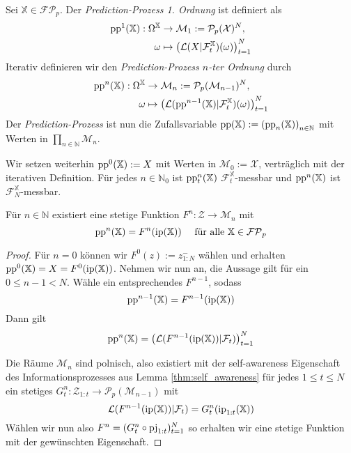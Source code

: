     \begin{definition}
        Sei $\mathbb{X} \in \mathcal{FP}_p$. Der \emph{Prediction-Prozess 1. Ordnung} ist definiert als
        \begin{align*}
            \operatorname{pp}^1(\mathbb{X}): \Omega^\mathbb{X} &\rightarrow \mathcal{M}_1 := \mathcal{P}_p(\mathcal{X})^N, \\
            \omega &\mapsto \left(\mathcal{L}(X \vert \mathcal{F}_t^\mathbb{X})(\omega)\right)_{t=1}^{N}
        \end{align*}
        Iterativ definieren wir den \emph{Prediction-Prozess $n$-ter Ordnung} durch
        \begin{align*}
            \operatorname{pp}^n(\mathbb{X}): \Omega^\mathbb{X} &\rightarrow \mathcal{M}_n := \mathcal{P}_p(\mathcal{M}_{n-1})^N, \\
            \omega &\mapsto \left(\mathcal{L}(\operatorname{pp}^{n-1}(\mathbb{X}) \vert \mathcal{F}_t^\mathbb{X})(\omega)\right)_{t=1}^{N}
        \end{align*}
        Der \emph{Prediction-Prozess} ist nun die Zufallsvariable $\operatorname{pp}(\mathbb{X}) := \left(\operatorname{pp}_n(\mathbb{X})\right)_{n\in\mathbb{N}}$ mit Werten in $\prod_{n\in\mathbb{N}} \mathcal{M}_n$.
    \end{definition}
    Wir setzen weiterhin $\operatorname{pp}^0(\mathbb{X}):=X$ mit Werten in $\mathcal{M}_0:=\mathcal{X}$, verträglich mit der iterativen Definition. Für jedes $n \in \mathbb{N}_0$ ist $\operatorname{pp}^n_t(\mathbb{X})$ $\mathcal{F}_t^\mathbb{X}$-messbar und $\operatorname{pp}^n(\mathbb{X})$ ist $\mathcal{F}_N^\mathbb{X}$-messbar.
    \begin{lemma}\label{thm:pp_from_ip}
        Für $n \in \mathbb{N}$ existiert eine stetige Funktion $F^n: \mathcal{Z} \rightarrow \mathcal{M}_n$ mit 
        $$\operatorname{pp}^n(\mathbb{X}) = F^{n}(\operatorname{ip}(\mathbb{X})) \quad \text{ für alle } \mathbb{X} \in \mathcal{FP}_p$$
    \end{lemma}
    \begin{proof}
        Für $n=0$ können wir $F^0(z) := z^-_{1:N}$ wählen und erhalten $\operatorname{pp}^0(\mathbb{X}) = X = F^0(\operatorname{ip}(\mathbb{X}))$. Nehmen wir nun an, die Aussage gilt für ein $0\leq n-1 < N$. Wähle ein entsprechendes $F^{n-1}$, sodass 
        $$\operatorname{pp}^{n-1}(\mathbb{X}) = F^{n-1}(\operatorname{ip}(\mathbb{X}))$$
        Dann gilt 
        $$\operatorname{pp}^n(\mathbb{X}) = \left( \mathcal{L}(F^{n-1}(\operatorname{ip}(\mathbb{X})) \vert \mathcal{F}_t) \right)_{t=1}^{N}$$
        
        Die Räume $\mathcal{M}_n$ sind polnisch, also existiert mit der self-awareness Eigenschaft des Informationsprozesses aus Lemma \ref{thm:self_awareness} für jedes $1\leq t \leq N$ ein stetiges $G_t^n:\mathcal{Z}_{1:t} \rightarrow \mathcal{P}_p(\mathcal{M}_{n-1})$ mit 
        $$\mathcal{L}(F^{n-1}(\operatorname{ip}(\mathbb{X})) \vert \mathcal{F}_t) = G_t^n(\operatorname{ip}_{1:t}(\mathbb{X}))$$
        Wählen wir nun also $F^n=(G_t^n\circ \operatorname{pj}_{1:t})_{t=1}^N$ so erhalten wir eine stetige Funktion mit der gewünschten Eigenschaft.
    \end{proof}

